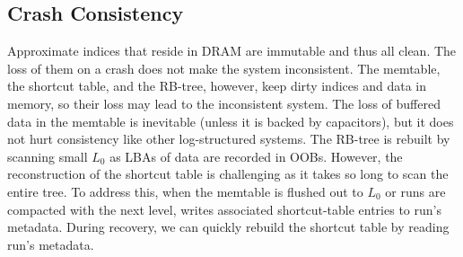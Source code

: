 \subsection{Crash Consistency}
Approximate indices that reside in
DRAM are immutable and thus all clean. The loss of them
on a crash does not make the system inconsistent. The
memtable, the shortcut table, and the RB-tree, however,
keep dirty indices and data in memory, 
so their loss may lead to the inconsistent system.
The loss of buffered data in the memtable is inevitable 
(unless it is backed by capacitors), but
it does not hurt consistency like other log-structured systems.  
The RB-tree is rebuilt by scanning small $L_0$ 
as LBAs of data are recorded in OOBs. 
However, the reconstruction of the shortcut table is challenging
as it takes so long to scan the entire tree.  
To address this, when the memtable is flushed out to $L_0$ 
or runs are compacted with the next level,
\ours{} writes associated shortcut-table entries to run's metadata.
During recovery, 
we can quickly rebuild the shortcut table 
by reading run's metadata.



